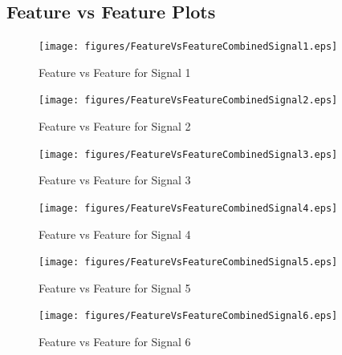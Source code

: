 \documentclass[]{article}
\begin{document}
\begin{appendices}








{\clearpage}

\section{Feature vs Feature Plots}
\label{appendix:Plots}
\setcounter{page}{1}
\begin{figure}[H]
    \centering
    \texttt{[image: figures/FeatureVsFeatureCombinedSignal1.eps]}
    \caption{Feature vs Feature for Signal 1}
\end{figure}

\begin{figure}[H]
    \centering
    \texttt{[image: figures/FeatureVsFeatureCombinedSignal2.eps]}
    \caption{Feature vs Feature for Signal 2}
\end{figure}

\begin{figure}[H]
    \centering
    \texttt{[image: figures/FeatureVsFeatureCombinedSignal3.eps]}
    \caption{Feature vs Feature for Signal 3}
\end{figure}

\begin{figure}[H]
    \centering
    \texttt{[image: figures/FeatureVsFeatureCombinedSignal4.eps]}
    \caption{Feature vs Feature for Signal 4}
\end{figure}

\begin{figure}[H]
    \centering
    \texttt{[image: figures/FeatureVsFeatureCombinedSignal5.eps]}
    \caption{Feature vs Feature for Signal 5}
\end{figure}

\begin{figure}[H]
    \centering
    \texttt{[image: figures/FeatureVsFeatureCombinedSignal6.eps]}
    \caption{Feature vs Feature for Signal 6}
\end{figure}


\end{appendices}
\end{document}
